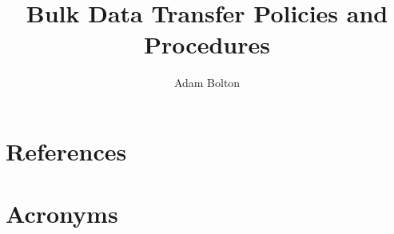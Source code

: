 \documentclass[OPS,authoryear,toc]{lsstdoc}
\title{Bulk Data Transfer Policies and Procedures}
\author{%
Adam Bolton
}
\date{\vcsDate}
\begin{document}
\maketitle


\appendix
\section{References} \label{sec:bib}
\renewcommand{\refname}{} %


\section{Acronyms} \label{sec:acronyms}

\end{document}

